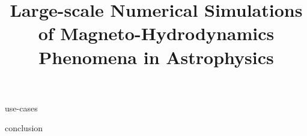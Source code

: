 \documentclass[a4paper,11pt]{report}
\begin{document}
\title{Large-scale Numerical Simulations of Magneto-Hydrodynamics Phenomena in Astrophysics}

\maketitle

\tableofcontents













 {use-cases}

 {conclusion}
		
\end{document}
